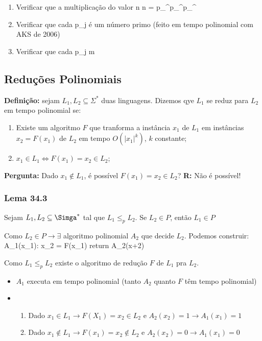 \documentclass[a4paper,oneside,article,table]{article}
\begin{document}
        \begin{enumerate}
            \item Verificar que a multiplicação do valor n
                n = p_{}^{}p_{}^{}p_{}^{}

            \item Verificar que cada p_j é um número primo (feito em tempo polinomial com AKS de 2006)
            \item Verificar que cada p_j \ge m
        \end{enumerate}

        \subsection{Reduções Polinomiais}
        \textbf{Definição:} sejam $L_1, L_2 \subseteq \Sigma^*$ duas linguagens. Dizemos qye $L_1$ se reduz para $L_2$ em tempo polinomial se:
        \begin{enumerate}
            \item Existe um algoritmo $F$ que tranforma a instância $x_1$ de $L_1$ em instâncias $x_2 = F(x_1)$ de $L_2$ em tempo $O(|x_1|^k)$, $k$ constante;
            \item $x_1 \in L_1 \iff F(x_1) = x_2 \in L_2$;
        \end{enumerate}

        \textbf{Pergunta:} Dado $x_1 \notin L_1$, é possível $F(x_1) = x_2 \in L_2$?
        \textbf{R:} Não é possível!

        \subsubsection{Lema 34.3}
        Sejam $L_1, L_2 \subseteq \Simga^*$ tal que $L_1 {\leq}_p L_2$. Se $L_2 \in P$, então $L_1 \in P$

        Como $L_2 \in P \rightarrow \exists$ algoritmo polinomial $A_2$ que decide $L_2$. Podemos construir:
        A_1(x_1):
        x_2 = F(x_1)
        return A_2(x+2)

        Como $L_1 {\leq}_p L_2$ existe o algoritmo de redução $F$ de $L_1$ pra $L_2$.

        \begin{itemize}
            \item $A_1$ executa em tempo polinomial (tanto $A_2$ quanto $F$ têm tempo polinomial)
            \item 
                \begin{enumerate}
                    \item Dado $x_1 \in L_1 \rightarrow F(X_1) = x_2 \in L_2$ e $A_2(x_2) = 1 \rightarrow A_1(x_1) = 1$
                    \item Dado $x_1 \notin L_1 \rightarrow F(x_1) = x_2 \notin L_2$ e $A_2(x_2) = 0 \rightarrow A_1(x_1) = 0$
                \end{enumerate}
        \end{itemize}
\end{document}
